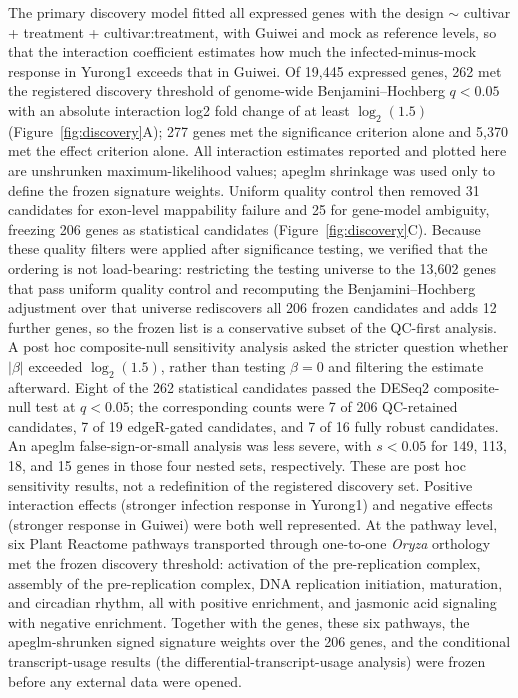\documentclass[referee,pdflatex,sn-basic,Numbered]{sn-jnl}
\newcommand{\q}{\textit{q}}
\begin{document}
The primary discovery model fitted all expressed genes with the design $\sim$ cultivar + treatment + cultivar:treatment, with Guiwei and mock as reference levels, so that the interaction coefficient estimates how much the infected-minus-mock response in Yurong1 exceeds that in Guiwei. Of 19,445 expressed genes, 262 met the registered discovery threshold of genome-wide Benjamini--Hochberg $\q<0.05$ with an absolute interaction log2 fold change of at least $\log_2(1.5)$ (Figure~\ref{fig:discovery}A); 277 genes met the significance criterion alone and 5,370 met the effect criterion alone. All interaction estimates reported and plotted here are unshrunken maximum-likelihood values; apeglm shrinkage was used only to define the frozen signature weights. Uniform quality control then removed 31 candidates for exon-level mappability failure and 25 for gene-model ambiguity, freezing 206 genes as statistical candidates (Figure~\ref{fig:discovery}C). Because these quality filters were applied after significance testing, we verified that the ordering is not load-bearing: restricting the testing universe to the 13,602 genes that pass uniform quality control and recomputing the Benjamini--Hochberg adjustment over that universe rediscovers all 206 frozen candidates and adds 12 further genes, so the frozen list is a conservative subset of the QC-first analysis. A post hoc composite-null sensitivity analysis asked the stricter question whether $|\beta|$ exceeded $\log_2(1.5)$, rather than testing $\beta=0$ and filtering the estimate afterward. Eight of the 262 statistical candidates passed the DESeq2 composite-null test at $\q<0.05$; the corresponding counts were 7 of 206 QC-retained candidates, 7 of 19 edgeR-gated candidates, and 7 of 16 fully robust candidates. An apeglm false-sign-or-small analysis was less severe, with $s<0.05$ for 149, 113, 18, and 15 genes in those four nested sets, respectively. These are post hoc sensitivity results, not a redefinition of the registered discovery set. Positive interaction effects (stronger infection response in Yurong1) and negative effects (stronger response in Guiwei) were both well represented. At the pathway level, six Plant Reactome pathways transported through one-to-one \textit{Oryza} orthology met the frozen discovery threshold: activation of the pre-replication complex, assembly of the pre-replication complex, DNA replication initiation, maturation, and circadian rhythm, all with positive enrichment, and jasmonic acid signaling with negative enrichment. Together with the genes, these six pathways, the apeglm-shrunken signed signature weights over the 206 genes, and the conditional transcript-usage results (the differential-transcript-usage analysis) were frozen before any external data were opened.
\end{document}
